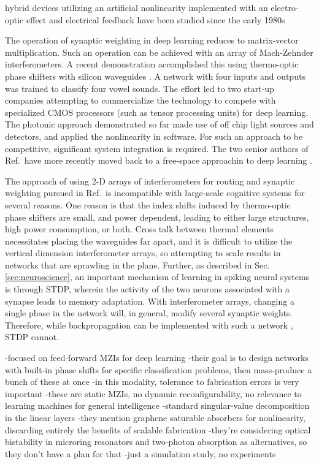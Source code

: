 hybrid devices utilizing an artificial nonlinearity implemented with an electro-optic effect and electrical feedback have been studied since the early 1980s \cite{sm1980,ko1981}

The operation of synaptic weighting in deep learning reduces to matrix-vector multiplication. Such an operation can be achieved with an array of Mach-Zehnder interferometers. A recent demonstration accomplished this using thermo-optic phase shifters with silicon waveguides \cite{shha2016}. A network with four inputs and outputs was trained to classify four vowel sounds. The effort led to two start-up companies attempting to commercialize the technology to compete with specialized CMOS processors (such as tensor processing units) for deep learning. The photonic approach demonstrated so far made use of off chip light sources and detectors, and applied the nonlinearity in software. For such an approach to be competitive, significant system integration is required. The two senior authors of Ref.\,\cite{shha2016} have more recently moved back to a free-space approachin to deep learning \cite{}.

The approach of using 2-D arrays of interferometers for routing and synaptic weighting pursued in Ref.\,\cite{shha2017} is incompatible with large-scale cognitive systems for several reasons. One reason is that the index shifts induced by thermo-optic phase shifters are small, and power dependent, leading to either large structures, high power consumption, or both. Cross talk between thermal elements necessitates placing the waveguides far apart, and it is difficult to utilize the vertical dimension interferometer arrays, so attempting to scale results in networks that are sprawling in the plane. Further, as described in Sec.\,\ref{sec:neuroscience}, an important mechanism of learning in spiking neural systems is through STDP, wherein the activity of the two neurons associated with a synapse leads to memory adaptation. With interferometer arrays, changing a single phase in the network will, in general, modify several synaptic weights. Therefore, while backpropagation can be implemented with such a network \cite{humi2018}, STDP cannot. 

\cite{fama2019}
-focused on feed-forward MZIs for deep learning
-their goal is to design networks with built-in phase shifts for specific classification problems, then mass-produce a bunch of these at once
-in this modality, tolerance to fabrication errors is very important
-these are static MZIs, no dynamic reconfigurability, no relevance to learning machines for general intelligence
-standard singular-value decomposition in the linear layers
-they mention graphene saturable absorbers for nonlinearity, discarding entirely the benefits of scalable fabrication
-they're considering optical bistability in microring resonators and two-photon absorption as alternatives, so they don't have a plan for that
-just a simulation study, no experiments

